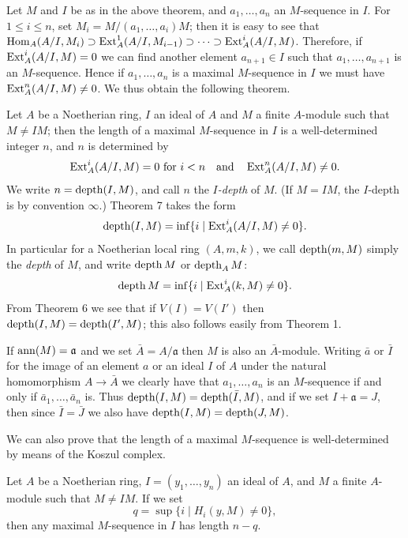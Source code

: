 Let $M$ and $I$ be as in the above theorem, and $a_1, \ldots, a_n$ an $M$-sequence
in $I$. For $1 \le i \le n$, set $M_i = M/(a_1, \ldots, a_i)M$; then it is easy to see
that $\operatorname{Hom}_A(A/I, M_i) \supset \operatorname{Ext}^1_A(A/I, M_{i-1}) \supset \cdots \supset \operatorname{Ext}^i_A(A/I, M)$. Therefore,
if $\operatorname{Ext}^i_A(A/I, M) = 0$ we can find another element $a_{n+1} \in I$ such that
$a_1, \ldots, a_{n+1}$ is an $M$-sequence. Hence if $a_1, \ldots, a_n$ is a maximal $M$-sequence
in $I$ we must have $\operatorname{Ext}^n_A(A/I, M) \neq 0$. We thus obtain the following theorem.

\begin{theorem}\label{thm:16.7}
Let $A$ be a Noetherian ring, $I$ an ideal of $A$ and $M$ a finite
$A$-module such that $M \neq IM$; then the length of a maximal $M$-sequence
in $I$ is a well-determined integer $n$, and $n$ is determined by
\[
  \operatorname{Ext}^i_A(A/I, M) = 0 \text{ for } i < n \quad \text{and} \quad \operatorname{Ext}^n_A(A/I, M) \neq 0.
\]
We write $n = \operatorname{depth}(I, M)$, and call $n$ the \emph{$I$-depth} of $M$. (If $M = IM$, the
$I$-depth is by convention $\infty$.) Theorem 7 takes the form
\[
  \operatorname{depth}(I, M) = \inf\{i \mid \operatorname{Ext}^i_A(A/I, M) \neq 0\}.
\]
In particular for a Noetherian local ring $(A, m, k)$, we call $\operatorname{depth}(m, M)$
simply the \emph{depth} of $M$, and write $\operatorname{depth} M$ or $\operatorname{depth}_A M$:
\[
  \operatorname{depth} M = \inf\{i \mid \operatorname{Ext}^i_A(k, M) \neq 0\}.
\]
From Theorem 6 we see that if $V(I) = V(I')$ then $\operatorname{depth}(I, M) =
\operatorname{depth} (I', M)$; this also follows easily from Theorem 1.

If $\operatorname{ann} (M) = \mathfrak{a}$ and we set $\bar{A} = A/\mathfrak{a}$ then $M$ is also an $\bar{A}$-module. Writing
$\bar{a}$ or $\bar{I}$ for the image of an element $a$ or an ideal $I$ of $A$ under the natural
homomorphism $A \to \bar{A}$ we clearly have that $a_1, \ldots, a_n$ is an $M$-sequence
if and only if $\bar{a}_1, \ldots, \bar{a}_n$ is. Thus $\operatorname{depth} (I, M) = \operatorname{depth} (\bar{I}, M)$, and if we set
$I + \mathfrak{a} = J$, then since $\bar{I} = \bar{J}$ we also have $\operatorname{depth} (I, M) = \operatorname{depth} (J, M)$.
\end{theorem}

We can also prove that the length of a maximal $M$-sequence is
well-determined by means of the Koszul complex.

\begin{theorem}\label{thm:16.8}
Let $A$ be a Noetherian ring, $I = (y_1, \ldots, y_n)$ an ideal of $A$,
and $M$ a finite $A$-module such that $M \neq IM$. If we set
\[
  q = \sup\{i \mid H_i(y, M) \neq 0\},
\]
then any maximal $M$-sequence in $I$ has length $n - q$.
\end{theorem}

